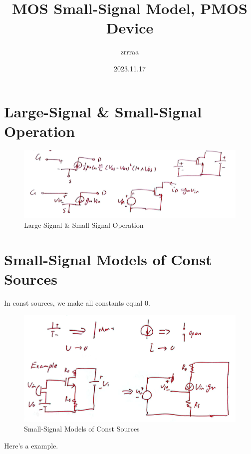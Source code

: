 \documentclass[fontset=windows]{article}
\title{\heiti\zihao{2} MOS Small-Signal Model, PMOS Device}
\author{\songti zrrraa}
\date{2023.11.17}
\begin{document}
\maketitle
\thispagestyle{empty}

\section*{Large-Signal \& Small-Signal Operation}

\begin{figure}[htbp]
    \centering
    \includegraphics[scale=0.6]{1.jpg}
    \captionsetup{labelformat=empty}
    \caption{Large-Signal \& Small-Signal Operation}
    \label{1}
\end{figure}

\section*{Small-Signal Models of Const Sources}

In const sources, we make all constants equal 0. 

\begin{figure}[htbp]
    \centering
    \includegraphics[scale=0.6]{2.jpg}
    \captionsetup{labelformat=empty}
    \caption{Small-Signal Models of Const Sources}
    \label{2}
\end{figure}

Here's a example. 
\end{document}
